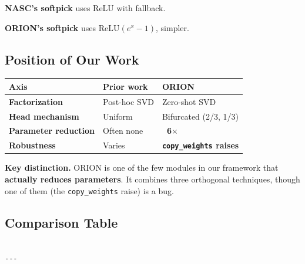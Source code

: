 \textbf{NASC's softpick} uses ReLU with fallback.

\textbf{ORION's softpick} uses $\text{ReLU}(e^x - 1)$, simpler.

\subsection{Position of Our Work}

\begin{table}[H]
\centering
\small
\begin{tabular}{lll}
\toprule
\textbf{Axis} & \textbf{Prior work} & \textbf{ORION} \\
\midrule
\textbf{Factorization} & Post-hoc SVD & Zero-shot SVD \\
\textbf{Head mechanism} & Uniform & Bifurcated (2/3, 1/3) \\
\textbf{Parameter reduction} & Often none & \textbf{~6$\times$} \\
\textbf{Robustness} & Varies & \textbf{\texttt{copy\_weights} raises} \\
\bottomrule
\end{tabular}
\end{table}

\textbf{Key distinction.} ORION is one of the few modules in our framework 
that \textbf{actually reduces parameters}. It combines three orthogonal 
techniques, though one of them (the \texttt{copy\_weights} raise) is a bug.



\subsection{Comparison Table}

\begin{lstlisting}

---
\end{lstlisting}
